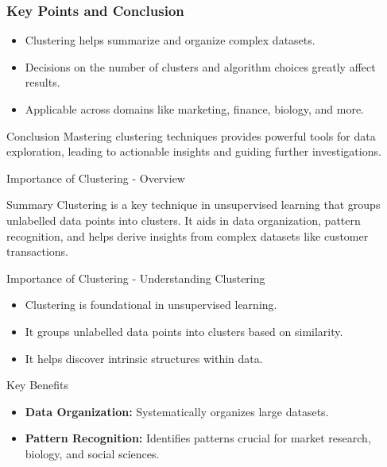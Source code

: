 \documentclass[aspectratio=169]{beamer}
\begin{document}
\begin{frame}[fragile]
    \frametitle{Key Points and Conclusion}
    \begin{itemize}
        \item Clustering helps summarize and organize complex datasets.
        \item Decisions on the number of clusters and algorithm choices greatly affect results.
        \item Applicable across domains like marketing, finance, biology, and more.
    \end{itemize}

    \begin{block}{Conclusion}
        Mastering clustering techniques provides powerful tools for data exploration, leading to actionable insights and guiding further investigations.
    \end{block}
\end{frame}

\begin{frame}[fragile]{Importance of Clustering - Overview}
  \begin{block}{Summary}
    Clustering is a key technique in unsupervised learning that groups unlabelled data points into clusters. It aids in data organization, pattern recognition, and helps derive insights from complex datasets like customer transactions.
  \end{block}
\end{frame}

\begin{frame}[fragile]{Importance of Clustering - Understanding Clustering}
    \begin{itemize}
        \item Clustering is foundational in unsupervised learning.
        \item It groups unlabelled data points into clusters based on similarity.
        \item It helps discover intrinsic structures within data.
    \end{itemize}

    \begin{block}{Key Benefits}
        \begin{itemize}
            \item \textbf{Data Organization:} Systematically organizes large datasets.
            \item \textbf{Pattern Recognition:} Identifies patterns crucial for market research, biology, and social sciences.
        \end{itemize}
    \end{block}
\end{frame}
\end{document}
